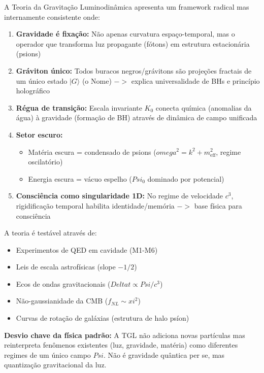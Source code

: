 \documentclass[12pt,a4paper]{article}
\def\Psi{Psi}%
\def\to{ -> }%
\def\xi{xi}%
\def\omega{omega}%
\def\Delta{Delta}%
\begin{document}
A Teoria da Gravitação Luminodinâmica apresenta um framework radical mas internamente consistente onde:

\begin{enumerate}
    \item \textbf{Gravidade é fixação:} Não apenas curvatura espaço-temporal, mas o operador que transforma luz propagante (fótons) em estrutura estacionária (psions)
    
    \item \textbf{Gráviton único:} Todos buracos negros/grávitons são projeções fractais de um único estado $|G\rangle$ (o Nome) $\to$ explica universalidade de BHs e princípio holográfico
    
    \item \textbf{Régua de transição:} Escala invariante $K_0$ conecta química (anomalias da água) à gravidade (formação de BH) através de dinâmica de campo unificada
    
    \item \textbf{Setor escuro:}
    \begin{itemize}
        \item Matéria escura = condensado de psions ($\omega^2 = k^2 + m_{\text{eff}}^2$, regime oscilatório)
        \item Energia escura = vácuo espelho ($\Psi_0$ dominado por potencial)
    \end{itemize}
    
    \item \textbf{Consciência como singularidade 1D:} No regime de velocidade $c^3$, rigidificação temporal habilita identidade/memória $\to$ base física para consciência
\end{enumerate}

A teoria é testável através de:
\begin{itemize}
    \item Experimentos de QED em cavidade (M1-M6)
    \item Leis de escala astrofísicas (slope $-1/2$)
    \item Ecos de ondas gravitacionais ($\Delta t \propto \Psi/c^3$)
    \item Não-gaussianidade da CMB ($f_{NL} \sim \xi^2$)
    \item Curvas de rotação de galáxias (estrutura de halo psíon)
\end{itemize}

\textbf{Desvio chave da física padrão:} A TGL não adiciona novas partículas mas reinterpreta fenômenos existentes (luz, gravidade, matéria) como diferentes regimes de um único campo $\Psi$. Não é gravidade quântica per se, mas quantização gravitacional da luz.
\end{document}
